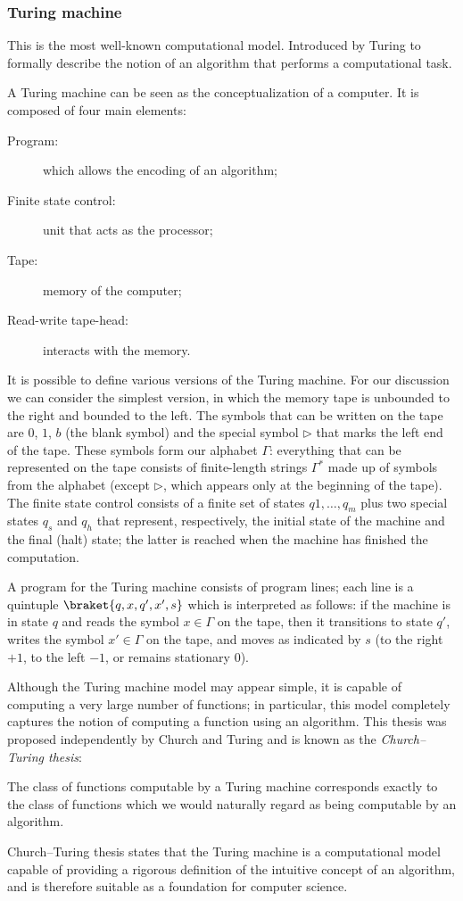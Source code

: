 \subsubsection*{Turing machine}
This is the most well-known computational model. Introduced by Turing to formally describe the notion of an algorithm that performs a computational task.

A Turing machine can be seen as the conceptualization of a computer. It is composed of four main elements:
\begin{description}
	\item[Program:] which allows the encoding of an algorithm;
	\item[Finite state control:]  unit that acts as the processor;
	\item[Tape:] memory of the computer;
	\item[Read-write tape-head:] interacts with the memory.
\end{description} 

It is possible to define various versions of the Turing machine. For our discussion we can consider the simplest version, in which the memory tape is unbounded to the right and bounded to the left. The symbols that can be written on the tape are $0$, $1$, $b$ (the blank symbol) and the special symbol $\triangleright$ that marks the left end of the tape. These symbols form our alphabet $\Gamma$: everything that can be represented on the tape consists of finite-length strings $\Gamma^*$ made up of symbols from the alphabet (except $\triangleright$, which appears only at the beginning of the tape). The finite state control consists of a finite set of states $q1, \dots, q_m$ plus two special states $q_s$ and $q_h$ that represent, respectively, the initial state of the machine and the final (halt) state; the latter is reached when the machine has finished the computation. 

A program for the Turing machine consists of program lines; each line is a quintuple $\braket{q, x, q', x', s}$ which is interpreted as follows: if the machine is in state $q$ and reads the symbol $x \in \Gamma$ on the tape, then it transitions to state $q'$, writes the symbol $x' \in \Gamma$ on the tape, and moves as indicated by $s$ (to the right $+1$, to the left $-1$, or remains stationary $0$).

Although the Turing machine model may appear simple, it is capable of computing a very large number of functions; in particular, this model completely captures the notion of computing a function using an algorithm. This thesis was proposed independently by Church and Turing and is known as the \emph{Church–Turing thesis}:
\begin{thesis}
	The class of functions computable by a Turing machine corresponds exactly to the class of functions which we would naturally regard as being computable by an algorithm.
\end{thesis}
Church–Turing thesis states that the Turing machine is a computational model capable of providing a rigorous definition of the intuitive concept of an algorithm, and is therefore suitable as a foundation for computer science.

